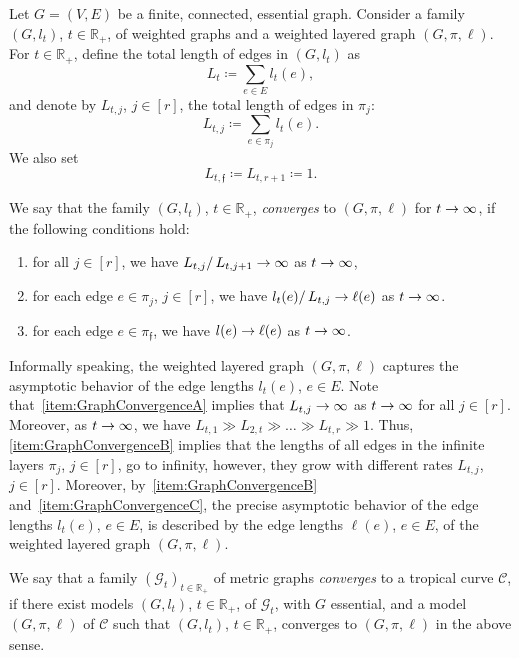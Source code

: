 \documentclass[AHL,Unicode,longabstracts]{cedram}
\newcommand{\rquot}[2]{#1/\,#2}
\newcommand{\R}{\mathbb{R}}
\newcommand{\mgr}{\mathcal{G}}
\newcommand{\curve}{\mathcal{C}}
\newcommand{\fin}{\mathfrak f}
\renewcommand*{\to}{\mathchoice{\longrightarrow}{\rightarrow}{\rightarrow}{\rightarrow}}
\newcommand*{\relabel}{\renewcommand{\labelenumi}{(\theenumi)}}
\newcommand*{\Alphenumi}{\renewcommand*{\theenumi}{\Alph{enumi}}\relabel}
\begin{document}
Let $G =(V,E)$ be a finite, connected, essential graph. Consider a family $(G, l_t)$, $t \in \R_+$, of weighted graphs and a weighted layered graph $(G, \pi, \ell)$. For $t \in \R_+$, define the total length of edges in $(G, l_t)$ as
\begin{equation}\label{eq:DefLength}
L_t \coloneqq \sum_{e \in E} l_t(e),
\end{equation}
and denote by $L_{t,j}$, $j\in [r]$, the total length of edges in $\pi_j$:
\begin{equation}\label{eq:DefGrLength}
L_{t, j} \coloneqq \sum_{e \in \pi_j} l_t(e).
\end{equation}
We also set
\begin{equation}\label{eq:DefGrLength}
L_{t, \fin} \coloneqq L_{t,r+1} \coloneqq 1.
\end{equation}

We say that the family $(G, l_t)$, $t \in \R_+$, \emph{converges} to $(G, \pi, \ell)$ for $t \to \infty$, if the following conditions hold:
\begin{enumerate}\Alphenumi
\item \label{item:GraphConvergenceA}
for all $j\in [r]$, we have $\rquot{L_{t,j}}{L_{t,j+1}} \to \infty$ as $t \to\infty$,
\item \label{item:GraphConvergenceB}
for each edge $e\in \pi_j$, $j\in[r]$, we have $\rquot{l_t(e)}{L_{t,j}} \to \ell(e)$ as $t \to \infty$.
\item \label{item:GraphConvergenceC}
for each edge $e \in \pi_\fin$, we have $l(e) \to \ell(e)$ as $t \to \infty$.
\end{enumerate}
Informally speaking, the weighted layered graph $(G, \pi, \ell)$ captures the asymptotic behavior of the edge lengths $l_t(e)$, $e \in E$. Note that~\eqref{item:GraphConvergenceA} implies that $L_{t, j} \to \infty$ as $t \to \infty$ for all $j \in [r]$. Moreover, as $t \to \infty$, we have $L_{t,1} \gg L_{2,t} \gg \dots \gg L_{t,r} \gg 1$. Thus, \eqref{item:GraphConvergenceB} implies that the lengths of all edges in the infinite layers $\pi_j$, $j \in [r]$, go to infinity, however, they grow with different rates $L_{t,j}$, $j \in [r]$. Moreover, by~\eqref{item:GraphConvergenceB} and~\eqref{item:GraphConvergenceC}, the precise asymptotic behavior of the edge lengths $l_t(e)$, $e\in E$, is described by the edge lengths $\ell(e)$, $e \in E$, of the weighted layered graph $(G,\pi, \ell)$.

We say that a family $(\mgr_t)_{t \in\R_+}$ of metric graphs \emph{converges} to a tropical curve $\curve$, if there exist models $(G, l_t)$, $t \in \R_+$, of $\mgr_t$, with $G$ essential, and a model $(G, \pi, \ell)$ of $\curve$ such that $(G, l_t)$, $t \in \R_+$, converges to $(G, \pi, \ell)$ in the above sense.
\end{document}
